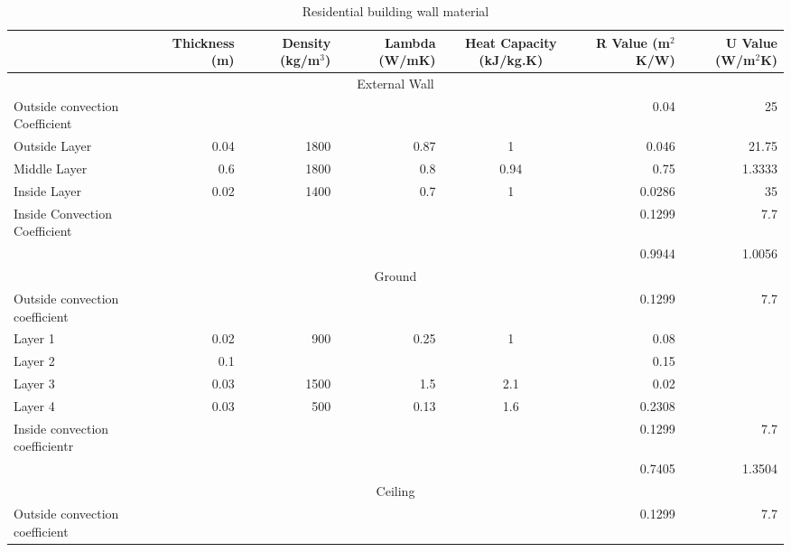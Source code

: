 \documentclass[a4paper, oneside]{discothesis}
\begin{document}
			\newpage
			\begin{table}[h!]
			  \centering
			\caption{Residential building wall material}
			    \begin{tabular}{rrrrcrr}
			    \toprule
			         & \multicolumn{1}{p{3.93em}}{Thickness (m)} & \multicolumn{1}{p{3.07em}}{Density (kg/m$^3$)} & \multicolumn{1}{p{3.145em}}{Lambda (W/mK)} & \multicolumn{1}{p{5.em}}{Heat \newline{}Capacity (kJ/kg.K)} & \multicolumn{1}{p{3.55em}}{R Value (m$^2$K/W)} & \multicolumn{1}{p{3.55em}}{U Value (W/m$^2$K)} \\
			    \midrule
			    \multicolumn{7}{c}{External Wall} \\
			    \midrule
			    \multicolumn{1}{l}{Outside convection Coefficient} &      &      &      &      & 0.04 & 25 \\
			    \multicolumn{1}{l}{Outside Layer} & 0.04 & 1800 & 0.87 & 1    & 0.046 & 21.75 \\
			    \multicolumn{1}{l}{Middle Layer} & 0.6  & 1800 & 0.8  & 0.94 & 0.75 & 1.3333 \\
			    \multicolumn{1}{l}{Inside Layer} & 0.02 & 1400 & 0.7  & 1    & 0.0286 & 35 \\
			    \multicolumn{1}{l}{Inside Convection Coefficient} &      &      &      &      & 0.1299 & 7.7 \\
			         &      &      &      &      & 0.9944 & 1.0056 \\
			    \midrule
			    \multicolumn{7}{c}{Ground} \\
			    \midrule
			    \multicolumn{1}{l}{Outside convection coefficient} &      &      &      &      & 0.1299 & 7.7 \\
			    \multicolumn{1}{l}{Layer 1} & 0.02 & 900  & 0.25 & 1    & 0.08 &  \\
			    \multicolumn{1}{l}{Layer 2} & 0.1  &      &      &      & 0.15 &  \\
			    \multicolumn{1}{l}{Layer 3} & 0.03 & 1500 & 1.5  & 2.1  & 0.02 &  \\
			    \multicolumn{1}{l}{Layer 4} & 0.03 & 500  & 0.13 & 1.6  & 0.2308 &  \\
			    \multicolumn{1}{l}{Inside convection coefficientr} &      &      &      &      & 0.1299 & 7.7 \\
			         &      &      &      &      & 0.7405 & 1.3504 \\
			    \midrule
			    \multicolumn{7}{c}{Ceiling} \\
			    \midrule
			    \multicolumn{1}{l}{Outside convection coefficient} &      &      &      &      & 0.1299 & 7.7 \\

\end{tabular}
\end{table}
\end{document}
